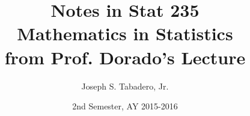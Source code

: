 \title{Notes in Stat 235\\
	Mathematics in Statistics\\
	from Prof. Dorado's Lecture
	}
\author{Joseph S. Tabadero, Jr.}
\date{2nd Semester, AY 2015-2016}